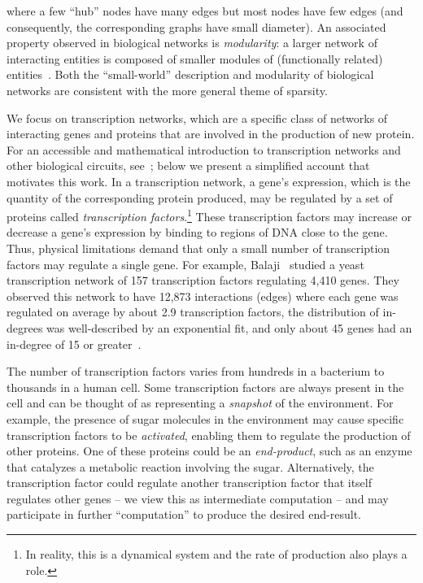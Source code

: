 where a few ``hub'' nodes have many edges but most nodes have few edges
(and consequently, the corresponding graphs have small diameter).
An associated property observed in biological networks is \emph{modularity}:
a larger network of interacting entities is composed of smaller modules of
(functionally related) entities~\cite{Hartwell:1999}.
Both the ``small-world'' description and modularity of biological networks are
consistent with the more general theme of sparsity.

We focus on transcription networks, which are a specific class of networks of
interacting genes and proteins that are involved in the production of new
protein. For an accessible and mathematical introduction to transcription
networks and other biological circuits, see~\cite{Alon:2006}; below we present a
simplified account that motivates this work.
In a transcription network, a gene's expression, which is the quantity of the
corresponding protein produced, may be regulated by a set of proteins called
\emph{transcription factors}.\footnote{In reality, this is a dynamical system
and the rate of production also plays a role.} These transcription factors
may increase or decrease a gene's expression by binding to regions of DNA close
to the gene. Thus, physical limitations demand that only a small number of
transcription factors may regulate a single gene.  For example, Balaji
\etal~studied a yeast transcription network of 157 transcription factors regulating 
4,410 genes. They observed this network to have 12,873 interactions (edges) where
each gene was regulated on average by about 2.9 transcription factors, the
distribution of in-degrees was well-described by an exponential fit, and only
about 45 genes had an in-degree of 15 or greater~\cite{Balaji:2006}.

The number of transcription factors varies from hundreds in a bacterium to
thousands in a human cell. Some transcription factors are always present in the
cell and can be thought of as representing a \emph{snapshot} of the environment.
For example, the presence of sugar molecules in the environment may cause
specific transcription factors to be \emph{activated}, enabling them to regulate
the production of other proteins.  One of these proteins could be an
\emph{end-product}, such as an enzyme that catalyzes a metabolic reaction
involving the sugar. Alternatively, the transcription factor could regulate
another transcription factor that itself
regulates other genes -- we view this as intermediate computation -- and may
participate in further ``computation'' to produce the desired end-result.

